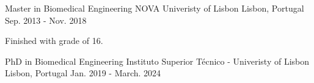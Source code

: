 

\begin{cventries}

  \cventry
    {Master in Biomedical Engineering} %
    {NOVA Univeristy of Lisbon} %
    {Lisbon, Portugal} %
    {Sep. 2013 - Nov. 2018} %
    {
      \begin{cvitems} %
        \item {Finished with grade of 16.}
      \end{cvitems}
    }
  \cventry
    {PhD in Biomedical Engineering} %
    {Instituto Superior Técnico - Univeristy of Lisbon} %
    {Lisbon, Portugal} %
    {Jan. 2019 - March. 2024} %
    {
    }
\end{cventries}
